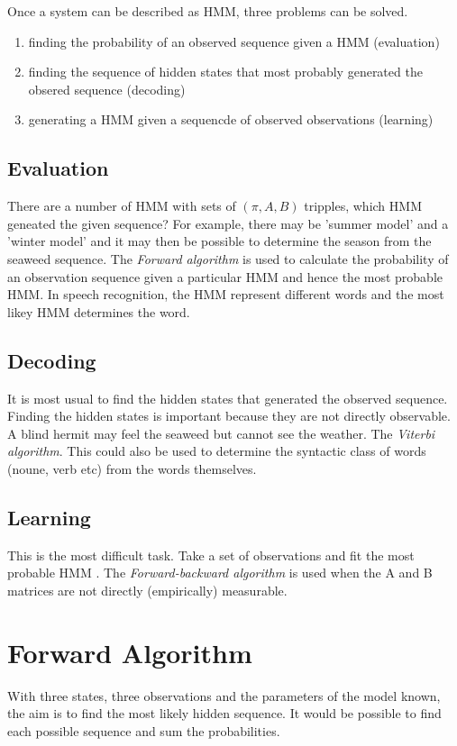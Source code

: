 \documentclass[12pt, a4paper, oneside]{article} %
\begin{document}
Once a system can be described as HMM, three problems can be solved. 
\begin{enumerate}
\item finding the probability of an observed sequence given a HMM (evaluation)
\item finding the sequence of hidden states that most probably generated the obsered sequence (decoding)
\item generating a HMM given a sequencde of observed observations (learning)
\end{enumerate}

\subsection{Evaluation}
There are a number of HMM with sets of $(\pi, A, B)$ tripples, which HMM geneated the given sequence?  For example, there may be 'summer model' and a 'winter model' and it may then be possible to determine the season from the seaweed sequence. The \emph{Forward algorithm} is used to calculate the probability of an observation sequence given a particular HMM and hence the most probable HMM.  In speech recognition, the HMM represent different words and the most likey HMM determines the word. 

\subsection{Decoding}
It is most usual to find the hidden states that generated the observed sequence.  Finding the hidden states is important because they are not directly observable.  A blind hermit may feel the seaweed but cannot see the weather. The \emph{Viterbi algorithm}.  This could also be used to determine the syntactic class of words (noune, verb etc) from the words themselves.  

\subsection{Learning}
This is the most difficult task.  Take a set of observations and fit the most probable HMM . The \emph{Forward-backward algorithm} is used when the A and B matrices are not directly (empirically) measurable.  

\section{Forward Algorithm}
With three states, three observations and the parameters of the model known, the aim is to find the most likely hidden sequence.  It would be possible to find each possible sequence and sum the probabilities.  
\end{document}
